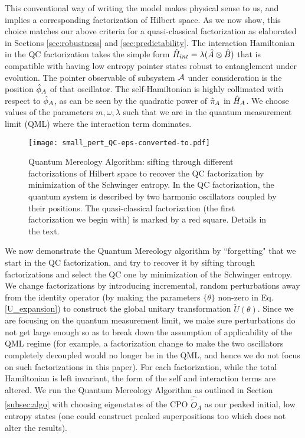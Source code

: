 \documentclass[aps,pra,onecolumn,nofootinbib,12pt,tightenlines]{revtex4-1}
\begin{document}
This conventional way of writing the model makes physical sense to us, and implies a corresponding factorization of Hilbert space.
As we now show, this choice matches our above criteria for a quasi-classical factorization as elaborated in Sections \ref{sec:robustness} and \ref{sec:predictability}. 
The interaction Hamiltonian in the QC factorization takes the simple form $\hat{H}_{int} = \lambda(\hat{A} \otimes \hat{B} )$ that is compatible with having low entropy pointer states robust to entanglement under evolution. The pointer observable of subsystem $\mathcal{A}$ under consideration is the position $\hat{\phi}_A$ of that oscillator. The self-Hamiltonian is highly collimated with respect to $\hat{\phi}_A$, as can be seen by the quadratic power of $\hat{\pi}_A$ in $\hat{H}_{A}$. We choose values of the parameters $m,\omega,\lambda$ such that we are in the quantum measurement limit (QML) where the interaction term dominates.

 \begin{figure}
\texttt{[image: small\_pert\_QC-eps-converted-to.pdf]}
\caption{Quantum Mereology Algorithm: sifting through different factorizations of Hilbert space to recover the QC factorization by minimization of the Schwinger entropy. In the QC factorization, the quantum system is described by two harmonic oscillators coupled by their positions. The quasi-classical factorization (the first factorization we begin with) is marked by a red square. Details in the text.}
\label{fig:mereo_1}
\end{figure}

We now demonstrate the Quantum Mereology algorithm by ``forgetting" that we start in the QC factorization, and try to recover it by sifting through factorizations and select the QC one by minimization of the Schwinger entropy. We change factorizations by introducing incremental, random perturbations away from the identity operator (by making the parameters $\{\theta\}$ non-zero in Eq. \ref{U_expansion}) to construct the global unitary transformation $\tilde{U}(\theta)$. 
Since we are focusing on the quantum measurement limit, we make sure perturbations do not get large enough so as to break down the assumption of applicability of the QML regime (for example, a factorization change to make the two oscillators completely decoupled would no longer be in the QML, and hence we do not focus on such factorizations in this paper). For each factorization, while the total Hamiltonian is left invariant, the form of the self and interaction terms are altered. We run the Quantum Mereology Algorithm as outlined in Section \ref{subsec:algo} with choosing eigenstates of the CPO $\hat{\tilde{O}}_{A}$ as our peaked initial, low entropy states (one could construct peaked superpositions too which does not alter the results).
\end{document}
